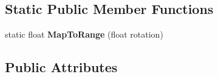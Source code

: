 \subsection*{Static Public Member Functions}
\begin{DoxyCompactItemize}
\item 
\hypertarget{class_skyrates_1_1_a_i_1_1_steering_1_1_basic_1_1_align_afdef1862ce6a0396a5fb4ac851598792}{static float {\bfseries Map\-To\-Range} (float rotation)}\label{class_skyrates_1_1_a_i_1_1_steering_1_1_basic_1_1_align_afdef1862ce6a0396a5fb4ac851598792}

\end{DoxyCompactItemize}
\subsection*{Public Attributes}
